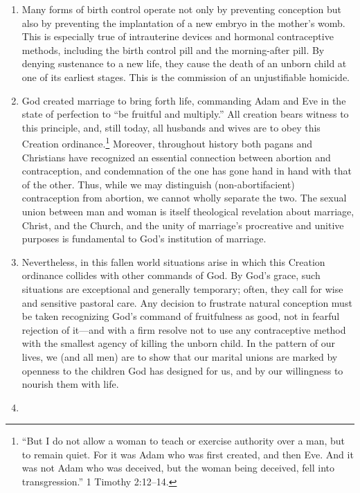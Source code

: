 \documentclass[
]{book}
\begin{document}
\begin{enumerate}
\item
  Many forms of birth control operate not only by preventing conception but also by preventing the implantation of a new embryo in the mother's womb. This is especially true of intrauterine devices and hormonal contraceptive methods, including the birth control pill and the morning-after pill. By denying sustenance to a new life, they cause the death of an unborn child at one of its earliest stages. This is the commission of an unjustifiable homicide.
\item
  God created marriage to bring forth life, commanding Adam and Eve in the state of perfection to ``be fruitful and multiply.'' All creation bears witness to this principle, and, still today, all husbands and wives are to obey this Creation ordinance.\footnote{``But I do not allow a woman to teach or exercise authority over a man, but to remain quiet. For it was Adam who was first created, and then Eve. And it was not Adam who was deceived, but the woman being deceived, fell into transgression.'' 1 Timothy 2:12--14.} Moreover, throughout history both pagans and Christians have recognized an essential connection between abortion and contraception, and condemnation of the one has gone hand in hand with that of the other. Thus, while we may distinguish (non-abortifacient) contraception from abortion, we cannot wholly separate the two. The sexual union between man and woman is itself theological revelation about marriage, Christ, and the Church, and the unity of marriage's procreative and unitive purposes is fundamental to God's institution of marriage.
\item
  Nevertheless, in this fallen world situations arise in which this Creation ordinance collides with other commands of God. By God's grace, such situations are exceptional and generally temporary; often, they call for wise and sensitive pastoral care. Any decision to frustrate natural conception must be taken recognizing God's command of fruitfulness as good, not in fearful rejection of it---and with a firm resolve not to use any contraceptive method with the smallest agency of killing the unborn child. In the pattern of our lives, we (and all men) are to show that our marital unions are marked by openness to the children God has designed for us, and by our willingness to nourish them with life.
\item

\end{enumerate}
\end{document}
